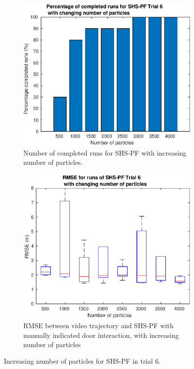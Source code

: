 \begin{figure}[H]
	\centering
	\begin{subfigure}[t]{.4\textwidth}
		\centering
		\includegraphics[width=\linewidth]{images/20201201_1625_Trial_6_nr_particles_1}
		\caption{Number of completed runs for SHS-PF with increasing number of particles.}
		\label{fig:trial6_nr_particles_completed}
	\end{subfigure} \quad
	\begin{subfigure}[t]{.4\textwidth}
		\centering
		\includegraphics[width=\linewidth]{images/20201201_1622_Trial_6_RMSE_nr_particles_1}
		\caption{RMSE between video trajectory and SHS-PF with manually indicated door interaction, with increasing number of particles}
		\label{fig:trial6_nr_particles_RMSE}
	\end{subfigure}
	\label{fig:trial6_nr_particles}
	\caption{Increasing number of particles for SHS-PF in trial 6.}
\end{figure}

